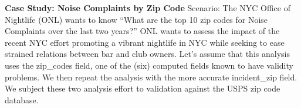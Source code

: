 \documentclass[12pt, titlepage]{article}
\begin{document}
\label{sec:case-study-zip-codes}
\textbf{Case Study: Noise Complaints by Zip Code} Scenario: The NYC 
Office of Nightlife (ONL) wants to know ``What are the top 10 
zip codes for Noise Complaints over the last two years?'' ONL wants
to assess the impact of the recent NYC effort promoting a vibrant nightlife 
in NYC while seeking to ease strained relations between bar 
and club owners. Let's assume that this analysis 
uses the zip\_codes field, one of the (six) computed fields known to 
have validity problems. We then repeat the analysis with the more 
accurate incident\_zip field. We subject these two analysis effort 
to validation against the USPS zip code database.

\end{document}

